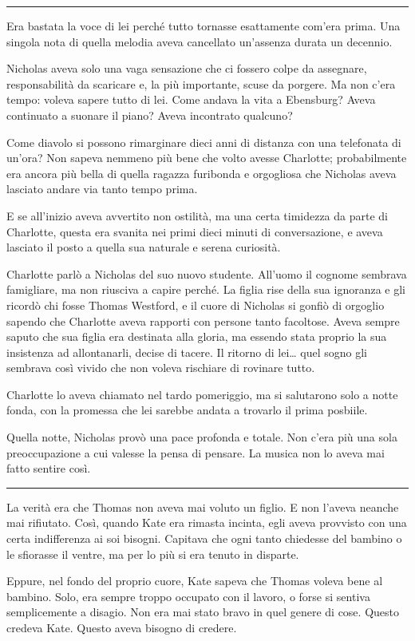\documentclass[a4paper,oneside,11pt]{memoir}
\begin{document}
\plainbreak{1}

Era bastata la voce di lei perché tutto tornasse esattamente com'era prima. Una
singola nota di quella melodia aveva cancellato un'assenza durata un decennio.

Nicholas aveva solo una vaga sensazione che ci fossero colpe da assegnare,
responsabilità da scaricare e, la più importante, scuse da porgere. Ma non c'era
tempo: voleva sapere tutto di lei. Come andava la vita a Ebensburg? Aveva
continuato a suonare il piano? Aveva incontrato qualcuno?

Come diavolo si possono rimarginare dieci anni di distanza con una telefonata di
un'ora? Non sapeva nemmeno più bene che volto avesse Charlotte; probabilmente
era ancora più bella di quella ragazza furibonda e orgogliosa che Nicholas aveva
lasciato andare via tanto tempo prima.

E se all'inizio aveva avvertito non ostilità, ma una certa timidezza da parte di
Charlotte, questa era svanita nei primi dieci minuti di conversazione, e aveva
lasciato il posto a quella sua naturale e serena curiosità.

Charlotte parlò a Nicholas del suo nuovo studente. All'uomo il cognome sembrava
famigliare, ma non riusciva a capire perché. La figlia rise della sua ignoranza
e gli ricordò chi fosse Thomas Westford, e il cuore di Nicholas si gonfiò di
orgoglio sapendo che Charlotte aveva rapporti con persone tanto facoltose. Aveva
sempre saputo che sua figlia era destinata alla gloria, ma essendo stata proprio
la sua insistenza ad allontanarli, decise di tacere. Il ritorno di lei\dots{}
quel sogno gli sembrava così vivido che non voleva rischiare di rovinare tutto.

Charlotte lo aveva chiamato nel tardo pomeriggio, ma si salutarono solo a notte
fonda, con la promessa che lei sarebbe andata a trovarlo il prima posbiile.

Quella notte, Nicholas provò una pace profonda e totale. Non c'era più una sola
preoccupazione a cui valesse la pensa di pensare. La musica non lo aveva mai
fatto sentire così.

\plainbreak{1}

La verità era che Thomas non aveva mai voluto un figlio. E non l'aveva neanche
mai rifiutato. Così, quando Kate era rimasta incinta, egli aveva provvisto con
una certa indifferenza ai soi bisogni. Capitava che ogni tanto chiedesse del
bambino o le sfiorasse il ventre, ma per lo più si era tenuto in disparte.

Eppure, nel fondo del proprio cuore, Kate sapeva che Thomas voleva bene al
bambino. Solo, era sempre troppo occupato con il lavoro, o forse si sentiva
semplicemente a disagio. Non era mai stato bravo in quel genere di cose. Questo
credeva Kate. Questo aveva bisogno di credere.
\end{document}
